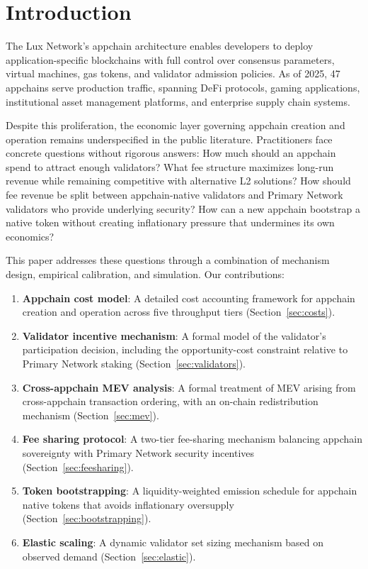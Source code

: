 \section{Introduction}


The Lux Network's appchain architecture enables developers to deploy application-specific
blockchains with full control over consensus parameters, virtual machines, gas tokens,
and validator admission policies. As of 2025, 47 appchains serve production traffic,
spanning DeFi protocols, gaming applications, institutional asset management platforms, and
enterprise supply chain systems.

Despite this proliferation, the economic layer governing appchain creation and operation
remains underspecified in the public literature. Practitioners face concrete questions
without rigorous answers: How much should an appchain spend to attract enough validators?
What fee structure maximizes long-run revenue while remaining competitive with alternative
L2 solutions? How should fee revenue be split between appchain-native validators and Primary
Network validators who provide underlying security? How can a new appchain bootstrap a
native token without creating inflationary pressure that undermines its own economics?

This paper addresses these questions through a combination of mechanism design, empirical
calibration, and simulation. Our contributions:

\begin{enumerate}[leftmargin=1.5em]
  \item \textbf{Appchain cost model}: A detailed cost accounting framework for appchain
    creation and operation across five throughput tiers (Section~\ref{sec:costs}).
  \item \textbf{Validator incentive mechanism}: A formal model of the validator's
    participation decision, including the opportunity-cost constraint relative to
    Primary Network staking (Section~\ref{sec:validators}).
  \item \textbf{Cross-appchain MEV analysis}: A formal treatment of MEV arising from
    cross-appchain transaction ordering, with an on-chain redistribution mechanism
    (Section~\ref{sec:mev}).
  \item \textbf{Fee sharing protocol}: A two-tier fee-sharing mechanism balancing appchain
    sovereignty with Primary Network security incentives (Section~\ref{sec:feesharing}).
  \item \textbf{Token bootstrapping}: A liquidity-weighted emission schedule for appchain
    native tokens that avoids inflationary oversupply (Section~\ref{sec:bootstrapping}).
  \item \textbf{Elastic scaling}: A dynamic validator set sizing mechanism based on
    observed demand (Section~\ref{sec:elastic}).
\end{enumerate}

